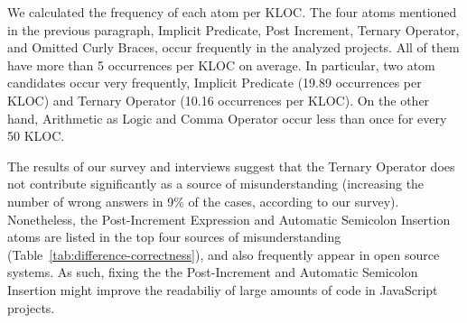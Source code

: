 We calculated the frequency of each atom per KLOC.
The four atoms mentioned in the previous paragraph,
 Implicit Predicate, Post Increment, Ternary Operator, and Omitted Curly Braces, occur frequently in the analyzed projects. All of them have more than 5 occurrences per KLOC on average. In particular, two atom candidates occur very frequently, Implicit Predicate (19.89 occurrences per KLOC) and Ternary Operator (10.16 occurrences per KLOC). On the other hand, Arithmetic as Logic and Comma Operator occur less than once for every 50 KLOC. 


The results of our survey and interviews suggest that the Ternary Operator does not contribute significantly as a source of misunderstanding (increasing the number of wrong answers in 9\% of the cases, according to our survey). Nonetheless, the Post-Increment Expression and Automatic Semicolon Insertion atoms are listed in the top four sources of misunderstanding  (Table~\ref{tab:difference-correctness}), and also frequently appear in open source systems. As such, fixing the the Post-Increment and Automatic Semicolon Insertion might improve the readabiliy of large amounts of code in JavaScript projects. 


